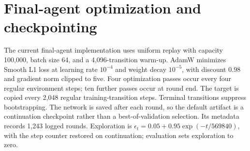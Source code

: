 \section{Final-agent optimization and checkpointing}
The current final-agent implementation uses uniform replay with capacity
100,000, batch size 64, and a 4,096-transition warm-up. AdamW minimizes
Smooth L1 loss at learning rate $10^{-4}$ and weight decay $10^{-5}$,
with discount $0.98$ and gradient norm clipped to five. Four optimization
passes occur every four regular environment steps; ten further passes
occur at round end. The target is copied every 2,048 regular training-transition steps.
Terminal transitions suppress bootstrapping. The network is saved after
each round, so the default artifact is a continuation checkpoint rather
than a best-of-validation selection. Its metadata records 1,243 logged rounds.
Exploration is $\epsilon_t=0.05+0.95\exp(-t/569840)$, with the step counter
restored on continuation; evaluation sets exploration to zero.
